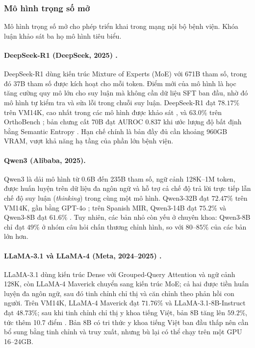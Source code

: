 \subsubsection{Mô hình trọng số mở}
Mô hình trọng số mở cho phép triển khai trong mạng nội bộ bệnh viện. Khóa luận khảo sát ba họ mô hình tiêu biểu.

\paragraph{DeepSeek-R1 (DeepSeek, 2025) \cite{deepseek_r1_2025}.}
DeepSeek-R1 dùng kiến trúc Mixture of Experts (MoE) với 671B tham số, trong đó 37B tham số được kích hoạt cho mỗi token. Điểm mới của mô hình là học tăng cường quy mô lớn cho suy luận mà không cần dữ liệu SFT ban đầu, nhờ đó mô hình tự kiểm tra và sửa lỗi trong chuỗi suy luận. DeepSeek-R1 đạt $78.17\%$ trên VM14K, cao nhất trong các mô hình được khảo sát \cite{vm14k_2025}, và $63.0\%$ trên OrthoBench \cite{orthopilot_2026}; bản chưng cất 70B đạt AUROC $0.837$ khi ước lượng độ bất định bằng Semantic Entropy \cite{mind_the_gap_2026}. Hạn chế chính là bản đầy đủ cần khoảng 960GB VRAM, vượt khả năng hạ tầng của phần lớn bệnh viện.

\paragraph{Qwen3 (Alibaba, 2025).}
Qwen3 là dải mô hình từ 0.6B đến 235B tham số, ngữ cảnh 128K--1M token, được huấn luyện trên dữ liệu đa ngôn ngữ và hỗ trợ cả chế độ trả lời trực tiếp lẫn chế độ suy luận (\emph{thinking}) trong cùng một mô hình. Qwen3-32B đạt $72.47\%$ trên VM14K, gần bằng GPT-4o \cite{vm14k_2025}; trên Spanish MIR, Qwen3-14B đạt $75.2\%$ và Qwen3-8B đạt $61.6\%$ \cite{spanish_mir_2026}. Tuy nhiên, các bản nhỏ còn yếu ở chuyên khoa: Qwen3-8B chỉ đạt $49\%$ ở nhóm câu hỏi chấn thương chỉnh hình, so với $80$--$85\%$ của các bản lớn hơn.

\paragraph{LLaMA-3.1 và LLaMA-4 (Meta, 2024--2025) \cite{llama3_2024}.}
LLaMA-3.1 dùng kiến trúc Dense với Grouped-Query Attention và ngữ cảnh 128K, còn LLaMA-4 Maverick chuyển sang kiến trúc MoE; cả hai được tiền huấn luyện đa ngôn ngữ, sau đó tinh chỉnh chỉ thị và căn chỉnh theo phản hồi con người. Trên VM14K, LLaMA-4 Maverick đạt $71.76\%$ và LLaMA-3.1-8B-Instruct đạt $48.73\%$; sau khi tinh chỉnh chỉ thị y khoa tiếng Việt, bản 8B tăng lên $59.2\%$, tức thêm 10.7 điểm \cite{vm14k_2025}. Bản 8B có tri thức y khoa tiếng Việt ban đầu thấp nên cần bổ sung bằng tinh chỉnh và truy xuất, nhưng bù lại có thể chạy trên một GPU 16--24GB.

